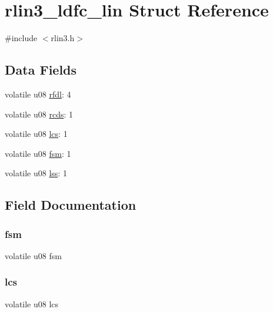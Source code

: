 \hypertarget{structrlin3__ldfc__lin}{}\section{rlin3\+\_\+ldfc\+\_\+lin Struct Reference}
\label{structrlin3__ldfc__lin}


{\ttfamily \#include $<$rlin3.\+h$>$}

\subsection*{Data Fields}
\begin{DoxyCompactItemize}
\item 
volatile u08 \mbox{\hyperlink{structrlin3__ldfc__lin_a6748ca4bb6bcfaa4680f5466ce310921}{rfdl}}\+: 4
\item 
volatile u08 \mbox{\hyperlink{structrlin3__ldfc__lin_a270e639a3831e5252a83ce8330131e1d}{rcds}}\+: 1
\item 
volatile u08 \mbox{\hyperlink{structrlin3__ldfc__lin_ae1af7f988574559c5c1284316a41fe88}{lcs}}\+: 1
\item 
volatile u08 \mbox{\hyperlink{structrlin3__ldfc__lin_aff88323cbb690e99a339202381a908d9}{fsm}}\+: 1
\item 
volatile u08 \mbox{\hyperlink{structrlin3__ldfc__lin_a957f6b19bf88361fde744c8fbfa6ad5d}{lss}}\+: 1
\end{DoxyCompactItemize}


\subsection{Field Documentation}
\mbox{\label{structrlin3__ldfc__lin_aff88323cbb690e99a339202381a908d9}} 
\subsubsection{\texorpdfstring{fsm}{fsm}}
{\footnotesize\ttfamily volatile u08 fsm}

\mbox{\label{structrlin3__ldfc__lin_ae1af7f988574559c5c1284316a41fe88}} 
\subsubsection{\texorpdfstring{lcs}{lcs}}
{\footnotesize\ttfamily volatile u08 lcs}

